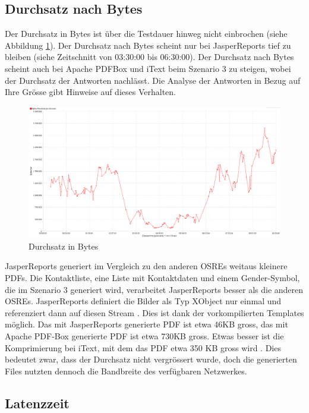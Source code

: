 \documentclass[main.tex]{subfiles}
\begin{document}
\subsection{Durchsatz nach Bytes}
Der Durchsatz in Bytes ist über die Testdauer hinweg nicht einbrochen (siehe Abbildung \ref{figure:throughputBytesAll}). Der Durchsatz nach Bytes scheint nur bei JasperReports tief zu bleiben (siehe Zeitschnitt von 03:30:00 bis 06:30:00). Der Durchsatz nach Bytes scheint auch bei Apache PDFBox und iText beim Szenario 3 zu steigen,  wobei der Durchsatz der Antworten nachlässt. Die Analyse der Antworten in Bezug auf Ihre Grösse gibt Hinweise auf dieses Verhalten. 
\begin{figure}[!h]
\includegraphics[width=\textwidth]{mainpart/4_analyse_img/ThroughputOverTimeAll.png}
 \caption{Durchsatz in Bytes}
 \label{figure:throughputBytesAll}
\end{figure}


JasperReports generiert im Vergleich zu den anderen OSREs weitaus kleinere PDFs. Die Kontaktliste, eine Liste mit Kontaktdaten und einem Gender-Symbol, die im Szenario 3 generiert wird, verarbeitet JasperReports besser als die anderen OSREs. JasperReports definiert die Bilder als Typ XObject nur einmal und referenziert dann auf diesen Stream \cite[vgl.~Kap.~5]{whitington_2012}. Dies ist dank der vorkompilierten Templates möglich. Das mit JasperReports generierte PDF ist etwa 46KB gross, das mit Apache PDF-Box generierte PDF ist etwa 730KB gross. Etwas besser ist die Komprimierung bei iText, mit dem das PDF etwa 350 KB gross wird \cite[vgl.~Kap~13]{lowagie_2010}. Dies bedeutet zwar, dass der Durchsatz nicht vergrössert wurde, doch die generierten Files nutzten dennoch die Bandbreite des verfügbaren Netzwerkes. 


\subsection{Latenzzeit}
\end{document}
